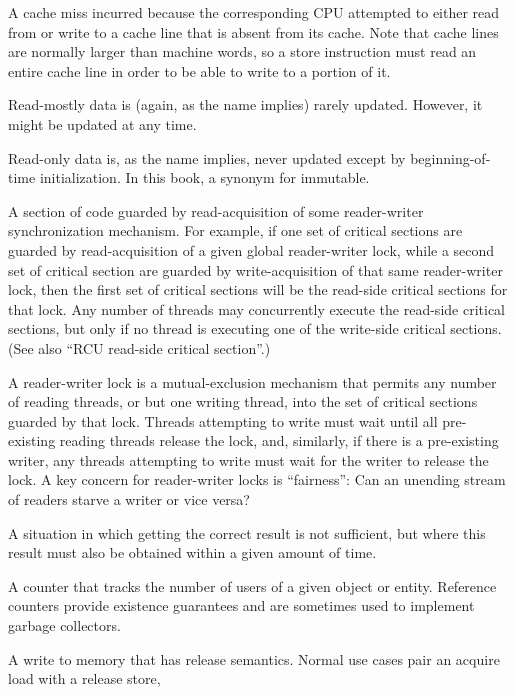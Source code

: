\begin{description}
	A cache miss incurred because the corresponding CPU attempted
	to either read from or write to a cache line that is absent
	from its cache.
	Note that cache lines are normally larger than machine words,
	so a store instruction must read an entire cache line in order
	to be able to write to a portion of it.
\item[\IXG{Read Mostly}:]
	Read-mostly data is (again, as the name implies) rarely updated.
	However, it might be updated at any time.
\item[\IXG{Read Only}:]
	Read-only data is, as the name implies, never updated except
	by beginning-of-time initialization.
	In this book, a synonym for immutable.
\item[\IXGh{Read-Side}{Critical Section}:]
	A section of code guarded by read-acquisition of
	some reader-writer synchronization mechanism.
	For example, if one set of critical sections are guarded by
	read-acquisition of
	a given global reader-writer lock, while a second set of critical
	section are guarded by write-acquisition of that same reader-writer
	lock, then the first set of critical sections will be the
	read-side critical sections for that lock.
	Any number of threads may concurrently execute the read-side
	critical sections, but only if no thread is executing one of
	the write-side critical sections.
	(See also ``RCU read-side critical section''.)
\item[\IXGh{Reader-Writer}{Lock}:]
	A reader-writer lock is a mutual-exclusion mechanism that
	permits any number of reading
	threads, or but one writing thread, into the set of critical
	sections guarded by that lock.
	Threads attempting to write must wait until all pre-existing
	reading threads release the lock, and, similarly, if there
	is a pre-existing writer, any threads attempting to write must
	wait for the writer to release the lock.
	A key concern for reader-writer locks is ``fairness'':
	Can an unending stream of readers starve a writer or vice versa?
\item[\IXG{Real Time}:]
	A situation in which getting the correct result is not sufficient,
	but where this result must also be obtained within a given amount
	of time.
\item[\IXG{Reference Count}:]
	A counter that tracks the number of users of a given object or
	entity.
	Reference counters provide existence guarantees and are sometimes
	used to implement garbage collectors.
\item[\IXG{Release Store}:]
	A write to memory that has release semantics.
	Normal use cases pair an acquire load with a release store,

\end{description}

